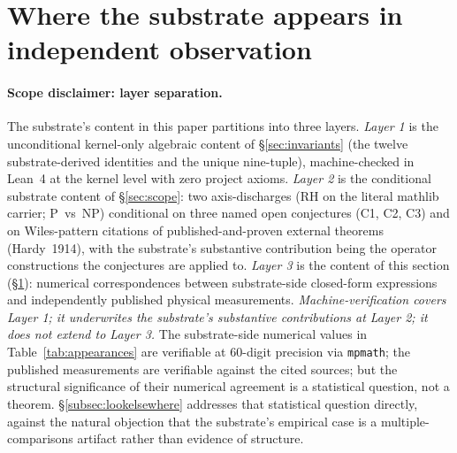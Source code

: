 \documentclass[11pt,a4paper]{amsart}
\theoremstyle{plain}
\theoremstyle{definition}
\begin{document}
\section{Where the substrate appears in independent observation}\label{sec:corroborations}

\paragraph{Scope disclaimer: layer separation.} The substrate's content in this paper partitions into three layers. \emph{Layer 1} is the unconditional kernel-only algebraic content of \S\ref{sec:invariants} (the twelve substrate-derived identities and the unique nine-tuple), machine-checked in Lean~4 at the kernel level with zero project axioms. \emph{Layer 2} is the conditional substrate content of \S\ref{sec:scope}: two axis-discharges (RH on the literal mathlib carrier; P~vs~NP) conditional on three named open conjectures (C1, C2, C3) and on Wiles-pattern citations of published-and-proven external theorems (Hardy~1914), with the substrate's substantive contribution being the operator constructions the conjectures are applied to. \emph{Layer 3} is the content of this section (\S\ref{sec:corroborations}): numerical correspondences between substrate-side closed-form expressions and independently published physical measurements. \emph{Machine-verification covers Layer 1; it underwrites the substrate's substantive contributions at Layer 2; it does not extend to Layer 3.} The substrate-side numerical values in Table~\ref{tab:appearances} are verifiable at 60-digit precision via \texttt{mpmath}; the published measurements are verifiable against the cited sources; but the structural significance of their numerical agreement is a statistical question, not a theorem. \S\ref{subsec:lookelsewhere} addresses that statistical question directly, against the natural objection that the substrate's empirical case is a multiple-comparisons artifact rather than evidence of structure.
\end{document}

